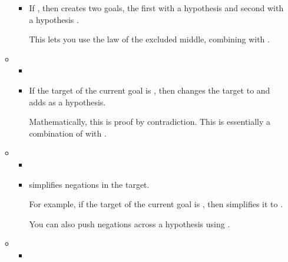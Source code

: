 \documentclass[letterpaper,10pt,english]{sphinxmanual}
\begin{document}
\begin{itemize}
\begin{itemize}
\begin{itemize}
\item {} 
\sphinxAtStartPar
If , then  creates two goals,
the first with a hypothesis  and second with a hypothesis .

\sphinxAtStartPar
This lets you use the law of the excluded middle, combining  with .

\end{itemize}

\item {} \begin{itemize}
\item {} 
\sphinxAtStartPar
{}

\item {} 
\sphinxAtStartPar
If the target of the current goal is  ,
then  changes the target to   and
adds  as a hypothesis.

\sphinxAtStartPar
Mathematically, this is proof by contradiction.
This is essentially a combination of  with .

\end{itemize}

\item {} \begin{itemize}
\item {} 
\sphinxAtStartPar
{}

\item {} 
\sphinxAtStartPar
{} simplifies negations in the target.

\sphinxAtStartPar
For example, if the target of the current goal is , then
 simplifies it to .

\sphinxAtStartPar
You can also push negations across a hypothesis  using .

\end{itemize}

\item {} \begin{itemize}
\item {} 
\sphinxAtStartPar
{}


\end{itemize}
\end{itemize}
\end{itemize}
\end{document}
